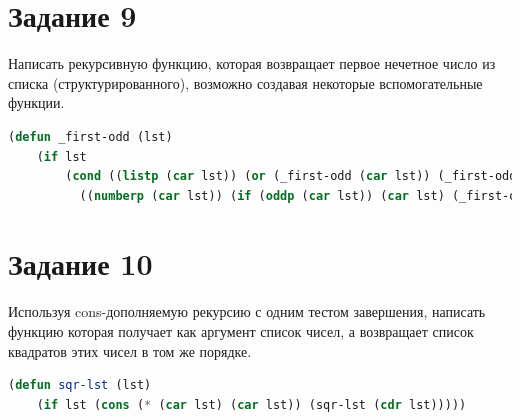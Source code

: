 \documentclass[12pt]{report}
\begin{document}
\section*{Задание 9}
Написать рекурсивную функцию, которая возвращает первое нечетное число из списка (структурированного), возможно создавая некоторые вспомогательные функции.


\begin{lstlisting}[language=Lisp]
(defun _first-odd (lst)
	(if lst
		(cond ((listp (car lst)) (or (_first-odd (car lst)) (_first-odd (cdr lst))))
		  ((numberp (car lst)) (if (oddp (car lst)) (car lst) (_first-odd (cdr lst)))))))
\end{lstlisting}

\section*{Задание 10}
Используя cons-дополняемую рекурсию с одним тестом завершения, написать функцию которая получает как аргумент список чисел, а возвращает список квадратов этих чисел в том же порядке.

\begin{lstlisting}[language=Lisp]
(defun sqr-lst (lst)
	(if lst (cons (* (car lst) (car lst)) (sqr-lst (cdr lst)))))
\end{lstlisting}
	

	
	
\end{document}
